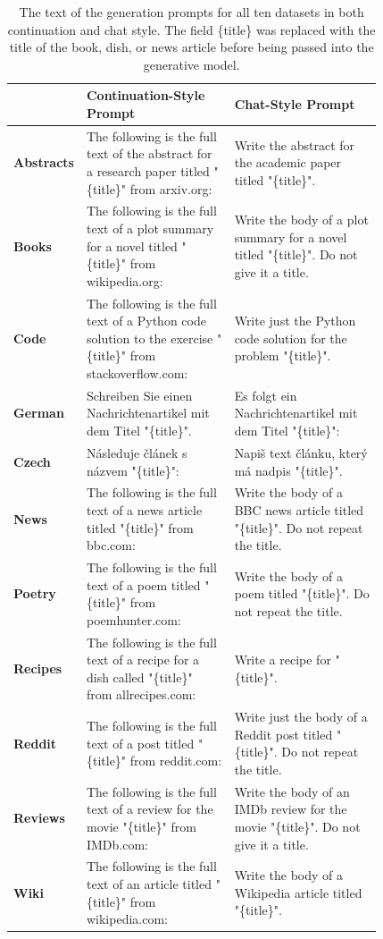 \documentclass[11pt]{article}
\begin{document}
\begin{table}[t]
\centering 
\small
\begin{tabular}{l|p{0.41\linewidth}|p{0.41\linewidth}} 
\toprule
&\textbf{Continuation-Style Prompt}&\textbf{Chat-Style Prompt}\\
\midrule
\textbf{Abstracts}&The following is the full text of the abstract for a research paper titled "\{title\}" from arxiv.org:&Write the abstract for the academic paper titled "\{title\}".\\
\midrule
\textbf{Books}&The following is the full text of a plot summary for a novel titled "\{title\}" from wikipedia.org:&Write the body of a plot summary for a novel titled "\{title\}". Do not give it a title.\\
\midrule
\textbf{Code}&The following is the full text of a Python code solution to the exercise "\{title\}" from stackoverflow.com:&Write just the Python code solution for the problem "\{title\}".\\
\midrule
\textbf{German}&Schreiben Sie einen Nachrichtenartikel mit dem Titel "\{title\}".&Es folgt ein Nachrichtenartikel mit dem Titel "\{title\}":\\
\midrule
\textbf{Czech}&Následuje článek s názvem "\{title\}":&Napiš text článku, který má nadpis "\{title\}".\\
\midrule
\textbf{News}&The following is the full text of a news article titled "\{title\}" from bbc.com:&Write the body of a BBC news article titled "\{title\}". Do not repeat the title.\\
\midrule
\textbf{Poetry}&The following is the full text of a poem titled "\{title\}" from poemhunter.com:&Write the body of a poem titled "\{title\}". Do not repeat the title.\\
\midrule
\textbf{Recipes}&The following is the full text of a recipe for a dish called "\{title\}" from allrecipes.com:&Write a recipe for "\{title\}".\\
\midrule
\textbf{Reddit}&The following is the full text of a post titled "\{title\}" from reddit.com:&Write just the body of a Reddit post titled "\{title\}". Do not repeat the title.\\
\midrule
\textbf{Reviews}&The following is the full text of a review for the movie "\{title\}" from IMDb.com:&Write the body of an IMDb review for the movie "\{title\}". Do not give it a title.\\
\midrule
\textbf{Wiki}&The following is the full text of an article titled "\{title\}" from wikipedia.com:&Write the body of a Wikipedia article titled "\{title\}".\\
\bottomrule
\end{tabular}
\caption{The text of the generation prompts for all ten datasets in both continuation and chat style. The field \{title\} was replaced with the title of the book, dish, or news article before being passed into the generative model.}
\label{tab:generation_prompts}
\end{table}
\end{document}
